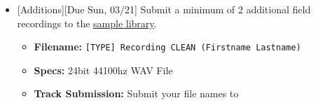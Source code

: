 \def\dMon{Mon, 03/15}
\def\dTues{Tues, 03/16}
\def\dWed{Wed, 03/17}
\def\dThur{Thur, 03/18}
\def\dFri{Fri, 03/19}
\def\dSat{Sat, 03/20}
\def\dSun{Sun, 03/21}
\placeDate

\begin{itemize}[noitemsep,topsep=0pt,leftmargin=*]
\item {}[Additions][Due \dSun] \newline 
 Submit a minimum of 2 additional field recordings to the \href{\#}{sample library}.
\begin{itemize}
	\item \textbf{Filename:} \texttt{[TYPE] Recording CLEAN (Firstname Lastname)}
	\item \textbf{Specs:} 24bit 44100hz WAV File
	\item \textbf{Track Submission:} Submit your file names to \discordS
\end{itemize}
\end{itemize}